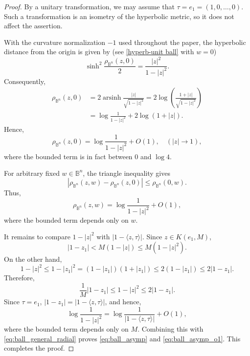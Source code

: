 \documentclass[10pt,a4paper]{amsart}
\numberwithin{equation}{section}
\begin{document}
\begin{proof}
By a unitary transformation, we may assume that
$\tau=e_1=(1,0,\ldots,0)$. Such a transformation is an isometry of the
hyperbolic metric, so it does not affect the assertion.

With the curvature normalization $-1$ used throughout the paper, the
hyperbolic distance from the origin is given by (see \eqref{hyperb-unit ball} with $w=0$)
\begin{equation*}
\label{eq:ball_origin_distance}
\sinh^2
\frac{\rho_{\mathbb B^n}(z,0)}{2}
=
\frac{|z|^2}{1-|z|^2}.
\end{equation*}
Consequently,
\begin{align*}
\rho_{\mathbb B^n}(z,0)
&=
2\operatorname{arsinh}
\frac{|z|}{\sqrt{1-|z|^2}}
=
2\log
\left(
\frac{1+|z|}{\sqrt{1-|z|^2}}
\right)
\\
&=
\log\frac{1}{1-|z|^2}
+
2\log(1+|z|).
\label{eq:ball_origin_asymp}
\end{align*}
Hence,
\begin{equation*}
\label{eq:ball_origin_o1}
\rho_{\mathbb B^n}(z,0)
=
\log\frac{1}{1-|z|^2}
+
O(1),
\quad
(|z|\to1),
\end{equation*}
where the bounded term is in fact between $0$ and $\log4$.

For arbitrary fixed $w\in\mathbb B^n$, the triangle inequality gives
\begin{equation*}
\left|
\rho_{\mathbb B^n}(z,w)
-
\rho_{\mathbb B^n}(z,0)
\right|
\le
\rho_{\mathbb B^n}(0,w).
\end{equation*}
Thus,
\begin{equation}
\label{eq:ball_general_radial}
\rho_{\mathbb B^n}(z,w)
=
\log\frac{1}{1-|z|^2}
+
O(1),
\end{equation}
where the bounded term depends only on $w$.

It remains to compare $1-|z|^2$ with
$|1-\langle z,\tau\rangle|$. Since $z\in K(e_1,M)$,
\begin{equation*}
\label{eq:ball_upper_comparison}
|1-z_1|
<
M(1-|z|)
\le
M(1-|z|^2).
\end{equation*}
On the other hand,
\begin{equation*}
1-|z|^2
\le
1-|z_1|^2
=
(1-|z_1|)(1+|z_1|)
\le
2(1-|z_1|)
\le
2|1-z_1|.
\end{equation*}
Therefore,
\begin{equation*}
\label{eq:ball_comparability}
\frac{1}{M}|1-z_1|
\le
1-|z|^2
\le
2|1-z_1|.
\end{equation*}
Since $\tau=e_1$,
$|1-z_1|=|1-\langle z,\tau\rangle|$, and hence,
\begin{equation*}
\log\frac{1}{1-|z|^2}
=
\log\frac{1}{|1-\langle z,\tau\rangle|}
+
O(1),
\end{equation*}
where the bounded term depends only on $M$. Combining this with
\eqref{eq:ball_general_radial} proves
\eqref{eq:ball_asymp} and \eqref{eq:ball_asymp_o1}. This completes the proof.
\end{proof}
\end{document}
